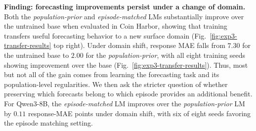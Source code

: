 \documentclass{article}
\begin{document}


\textbf{Finding: forecasting improvements persist under a change of domain.}
Both the \textit{population-prior} and \textit{episode-matched} LMs substantially improve over the untrained base when evaluated in Coin Harbor, showing that training transfers useful forecasting behavior to a new surface domain (Fig.~\ref{fig:exp3-transfer-results} top right). Under domain shift, response MAE falls from $7.30$ for the untrained base to $2.00$ for the \textit{population-prior}, with all eight training seeds showing improvement over the base (Fig.~\ref{fig:exp3-transfer-results}).
Thus, most but not all of the gain comes from learning the forecasting task and its population-level regularities.
We then ask the stricter question of whether preserving which forecasts belong to which episode provides an additional benefit.
For Qwen3-8B, the \textit{episode-matched} LM improves over the \textit{population-prior} LM by $0.11$ response-MAE points under domain shift, with six of eight seeds favoring the episode matching setting.
\end{document}
